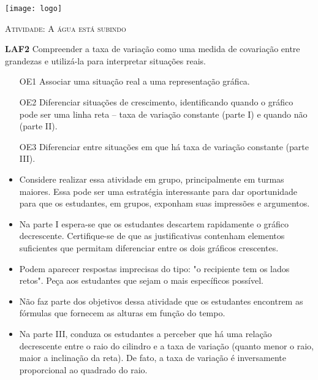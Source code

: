\documentclass[10 pt,usenames,dvipsnames, oneside]{article}
\begin{document}
\begin{center}
  \begin{minipage}[l]{3cm}
\texttt{[image: logo]}    
\end{minipage}\hfill
\begin{minipage}[r]{.8\textwidth}
 {\Large \scshape Atividade: A água está subindo}  
\end{minipage}
\end{center}
\vspace{.2cm}

\ifdefined\prof
\begin{objetivos}
\item \textbf{LAF2} Compreender a taxa de variação como uma medida de covariação entre grandezas e utilizá-la para interpretar situações reais.
\end{objetivos}

\begin{goals}
\begin{enumerate}

\item [OE1] Associar uma situação real a uma representação gráfica.

\item [OE2] Diferenciar situações de crescimento, identificando quando o gráfico pode ser uma linha reta – taxa de variação constante (parte I) e quando não (parte II).

\item [OE3] Diferenciar entre situações em que há taxa de variação constante (parte III).

\end{enumerate}

\tcblower

\begin{itemize}
\item Considere realizar essa atividade em grupo, principalmente em turmas maiores. Essa pode ser uma estratégia interessante para dar oportunidade para que os estudantes, em grupos, exponham suas impressões e argumentos.

\item Na parte I espera-se que os estudantes descartem rapidamente o gráfico decrescente. Certifique-se de que as justificativas contenham elementos suficientes que permitam diferenciar entre os dois gráficos crescentes.
\item Podem aparecer respostas imprecisas do tipo: "o recipiente tem os lados retos". Peça aos estudantes que sejam o mais específicos possível.
\item Não faz parte dos objetivos dessa atividade que os estudantes encontrem as fórmulas que fornecem as alturas em função do tempo.
\item Na parte III, conduza os estudantes a perceber que há uma relação decrescente entre o raio do cilindro e a taxa de variação (quanto menor o raio, maior a inclinação da reta). De fato, a taxa de variação é inversamente proporcional ao quadrado do raio.
\end{itemize}

\end{goals}
\end{document}
